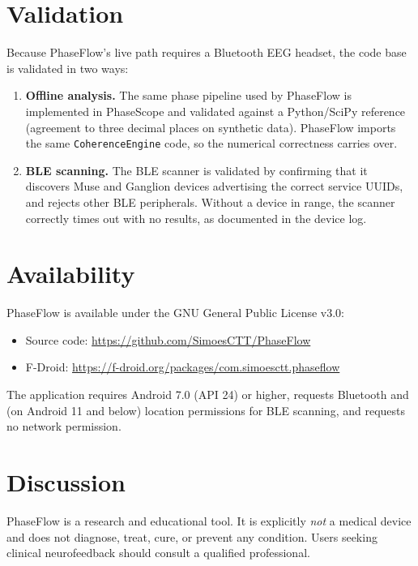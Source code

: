 \documentclass[11pt,a4paper]{article}
\begin{document}
\section{Validation}

Because PhaseFlow's live path requires a Bluetooth EEG headset, the code base is validated in two ways:

\begin{enumerate}
\item \textbf{Offline analysis.} The same phase pipeline used by PhaseFlow is implemented in PhaseScope and validated against a Python/SciPy reference (agreement to three decimal places on synthetic data). PhaseFlow imports the same \texttt{CoherenceEngine} code, so the numerical correctness carries over.
\item \textbf{BLE scanning.} The BLE scanner is validated by confirming that it discovers Muse and Ganglion devices advertising the correct service UUIDs, and rejects other BLE peripherals. Without a device in range, the scanner correctly times out with no results, as documented in the device log.
\end{enumerate}

\section{Availability}

PhaseFlow is available under the GNU General Public License v3.0:

\begin{itemize}
\item Source code: \url{https://github.com/SimoesCTT/PhaseFlow}
\item F-Droid: \url{https://f-droid.org/packages/com.simoesctt.phaseflow}
\end{itemize}

The application requires Android 7.0 (API 24) or higher, requests Bluetooth and (on Android 11 and below) location permissions for BLE scanning, and requests no network permission.

\section{Discussion}

PhaseFlow is a research and educational tool. It is explicitly \emph{not} a medical device and does not diagnose, treat, cure, or prevent any condition. Users seeking clinical neurofeedback should consult a qualified professional.
\end{document}

